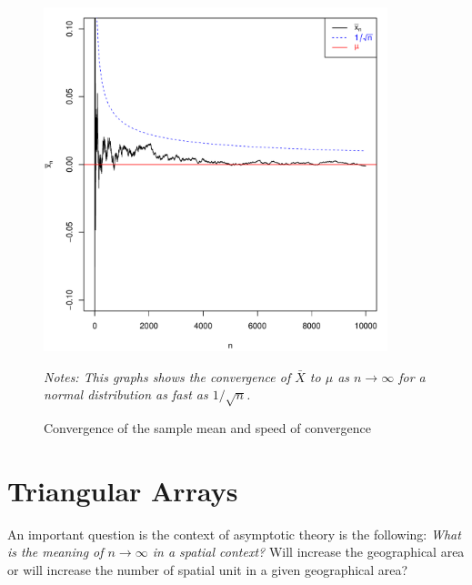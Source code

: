 \documentclass[english,12pt]{book}\usepackage[]{graphicx}\usepackage[]{xcolor}
\newenvironment{knitrout}{}{} %
\begin{document}
\begin{figure}[H]
  \caption{Convergence of the sample mean and speed of convergence}
    \label{fig:Op_example}
        \centering
    \begin{minipage}{.9\linewidth}
\begin{knitrout}
\color{fgcolor}

{\centering \includegraphics[width=10cm,height=10cm]{figure/CLT-normalplot-bigO-1} 

}


\end{knitrout}
\footnotesize
		\emph{Notes: This graphs shows the convergence of $\bar{X}$ to $\mu$ as $n\to\infty$ for a normal distribution as fast as $1/\sqrt{n}$.}
	\end{minipage}
\end{figure}

\section{Triangular Arrays}\label{sec:triangular-array}

An important question is the context of asymptotic theory is the following: \emph{What is the meaning of $n\to \infty$ in a spatial context?} Will increase the geographical area or will increase the number of spatial unit in a given geographical area? 
\end{document}

